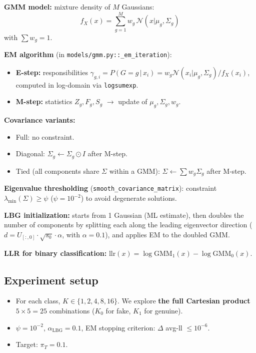 \documentclass[11pt,a4paper]{article}
\newcommand{\llr}{\textrm{llr}}
\begin{document}
\textbf{GMM model:} mixture density of $M$ Gaussians:
\[
f_X(x) = \sum_{g=1}^{M} w_g \, \mathcal{N}(x|\mu_g, \Sigma_g)
\]
with $\sum w_g = 1$.

\textbf{EM algorithm} (in \texttt{models/gmm.py::\_em\_iteration}):
\begin{itemize}
\item \textbf{E-step:} responsibilities
      $\gamma_{g,i} = P(G=g\,|\,x_i)
       = w_g \mathcal{N}(x_i|\mu_g, \Sigma_g)/f_X(x_i)$, computed in
      log-domain via \texttt{logsumexp}.
\item \textbf{M-step:} statistics $Z_g, F_g, S_g$ $\rightarrow$ update
      of $\mu_g, \Sigma_g, w_g$.
\end{itemize}

\textbf{Covariance variants:}
\begin{itemize}
\item Full: no constraint.
\item Diagonal: $\Sigma_g \leftarrow \Sigma_g \odot I$ after M-step.
\item Tied (all components share $\Sigma$ within a GMM):
      $\Sigma \leftarrow \sum w_g \Sigma_g$ after M-step.
\end{itemize}

\textbf{Eigenvalue thresholding}
(\texttt{smooth\_covariance\_matrix}): constraint
$\lambda_{\min}(\Sigma) \geq \psi$ ($\psi=10^{-2}$) to avoid
degenerate solutions.

\textbf{LBG initialization:} starts from 1 Gaussian (ML estimate),
then doubles the number of components by splitting each along the
leading eigenvector direction
($d = U_{[:,0]} \cdot \sqrt{s_0} \cdot \alpha$, with $\alpha=0.1$),
and applies EM to the doubled GMM.

\textbf{LLR for binary classification:}
$\llr(x) = \log \textrm{GMM}_1(x) - \log \textrm{GMM}_0(x)$.

\subsection{Experiment setup}

\begin{itemize}
\item For each class, $K \in \{1, 2, 4, 8, 16\}$. We explore
      \textbf{the full Cartesian product} $5 \times 5 = 25$
      combinations ($K_0$ for fake, $K_1$ for genuine).
\item $\psi = 10^{-2}$, $\alpha_{\textrm{LBG}} = 0.1$,
      EM stopping criterion: $\Delta$ avg-ll $\leq 10^{-6}$.
\item Target: $\pi_T = 0.1$.
\end{itemize}
\end{document}

